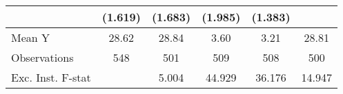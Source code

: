 {\begin{tabular}{l*{5}{c}}
            &     (1.619)         &     (1.683)         &     (1.985)         &     (1.383)         &                     \\
\midrule
Mean Y      &       28.62         &       28.84         &        3.60         &        3.21         &       28.81         \\
Observations&         548         &         501         &         509         &         508         &         500         \\
Exc. Inst. F-stat&                     &       5.004         &      44.929         &      36.176         &      14.947         \\
\bottomrule
\end{tabular}
}
